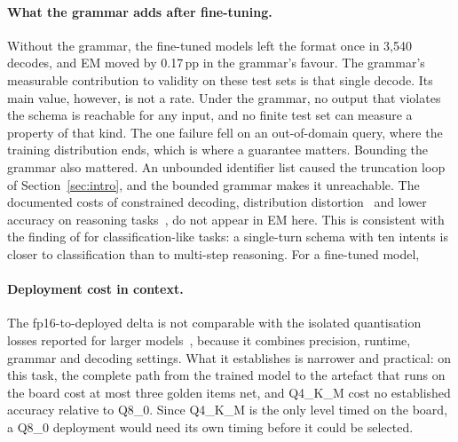 \documentclass[a4paper,fleqn]{cas-dc}
\newcommand{\pp}{\,pp}
\newcommand{\QF}{Q4\_K\_M}
\newcommand{\QE}{Q8\_0}
\begin{document}
\paragraph{What the grammar adds after fine-tuning.} Without the grammar, the fine-tuned models left
the format once in 3,540 decodes, and EM moved by 0.17\pp{} in the grammar's favour. The grammar's
measurable contribution to validity on these test sets is that single decode. Its main value,
however, is not a rate. Under the grammar, no output that violates the schema is reachable for any
input, and no finite test set can measure a property of that kind. The one failure fell on an
out-of-domain query, where the training distribution ends, which is where a guarantee matters.
Bounding the grammar also mattered. An unbounded identifier list caused the
truncation loop of Section~\ref{sec:intro}, and the bounded grammar makes it unreachable. The
documented costs of constrained decoding, distribution distortion~\citep{park2024} and lower
accuracy on reasoning tasks~\citep{tam2024}, do not appear in EM here. This is consistent with
the finding of \citet{tam2024} for classification-like tasks: a single-turn schema with ten intents is closer
to classification than to multi-step reasoning.  For a fine-tuned model, 

\paragraph{Deployment cost in context.} The fp16-to-deployed delta is not comparable with the
isolated quantisation losses reported for larger models~\citep{kurtic2025,kurt2026}, because it
combines precision, runtime, grammar and decoding settings. What it establishes is narrower and
practical: on this task, the complete path from the trained model to the artefact that runs on the
board cost at most three golden items net, and \QF{} cost no established accuracy relative to
\QE{}. Since \QF{} is the only level timed on the board, a \QE{} deployment would need its own
timing before it could be selected.
\end{document}
